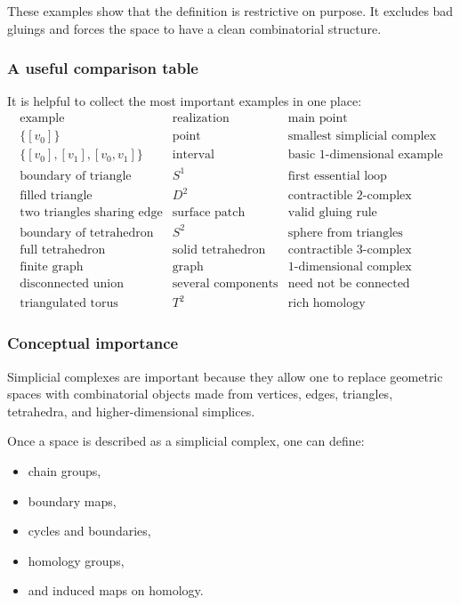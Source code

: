 \documentclass[12pt,a4paper]{article}
\theoremstyle{notespace}
\begin{document}
These examples show that the definition is restrictive on purpose. It excludes bad gluings and forces the space to have a clean combinatorial structure.

\subsubsection{A useful comparison table}

It is helpful to collect the most important examples in one place:
\[
\begin{array}{c|c|c}
	\text{example} & \text{realization} & \text{main point} \\ \hline
	\{[v_0]\} & \text{point} & \text{smallest simplicial complex} \\
	\{[v_0],[v_1],[v_0,v_1]\} & \text{interval} & \text{basic 1-dimensional example} \\
	\text{boundary of triangle} & S^1 & \text{first essential loop} \\
	\text{filled triangle} & D^2 & \text{contractible 2-complex} \\
	\text{two triangles sharing edge} & \text{surface patch} & \text{valid gluing rule} \\
	\text{boundary of tetrahedron} & S^2 & \text{sphere from triangles} \\
	\text{full tetrahedron} & \text{solid tetrahedron} & \text{contractible 3-complex} \\
	\text{finite graph} & \text{graph} & \text{1-dimensional complex} \\
	\text{disconnected union} & \text{several components} & \text{need not be connected} \\
	\text{triangulated torus} & T^2 & \text{rich homology}
\end{array}
\]

\subsubsection{Conceptual importance}

Simplicial complexes are important because they allow one to replace geometric spaces with combinatorial objects made from vertices, edges, triangles, tetrahedra, and higher-dimensional simplices.

Once a space is described as a simplicial complex, one can define:
\begin{itemize}
	\item chain groups,
	\item boundary maps,
	\item cycles and boundaries,
	\item homology groups,
	\item and induced maps on homology.
\end{itemize}
\end{document}
